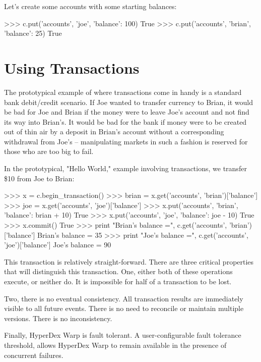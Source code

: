 Let's create some accounts with some starting balances:

\begin{pyconcode}
>>> c.put('accounts', 'joe', {'balance': 100})
True
>>> c.put('accounts', 'brian', {'balance': 25})
True
\end{pyconcode}

\section{Using Transactions}
\label{sec:transactions:using}

The prototypical example of where transactions come in handy is a standard bank
debit/credit scenario.  If Joe wanted to transfer currency to Brian, it would be
bad for Joe and Brian if the money were to leave Joe's account and not find its
way into Brian's.  It would be bad for the bank if money were to be created out
of thin air by a deposit in Brian's account without a corresponding withdrawal
from Joe's -- manipulating markets in such a fashion is reserved for those who
are too big to fail.

In the prototypical, "Hello World," example involving transactions, we transfer
\$10 from Joe to Brian:

\begin{pyconcode}
>>> x = c.begin_transaction()
>>> brian = x.get('accounts', 'brian')['balance']
>>> joe = x.get('accounts', 'joe')['balance']
>>> x.put('accounts', 'brian', {'balance': brian + 10})
True
>>> x.put('accounts', 'joe', {'balance': joe - 10})
True
>>> x.commit()
True
>>> print "Brian's balance =", c.get('accounts', 'brian')['balance']
Brian's balance = 35
>>> print "Joe's balance =", c.get('accounts', 'joe')['balance']
Joe's balance = 90
\end{pyconcode}

This transaction is relatively straight-forward.  There are three critical
properties that will distinguish this transaction.  One, either both of these
operations execute, or neither do.  It is impossible for half of a transaction
to be lost.

Two, there is no eventual consistency.  All transaction results are immediately
visible to all future events.  There is no need to reconcile or maintain
multiple versions.  There is no inconsistency.

Finally, HyperDex Warp is fault tolerant.  A user-configurable fault tolerance
threshold,  allows HyperDex Warp to remain available in the presence of
concurrent failures.

